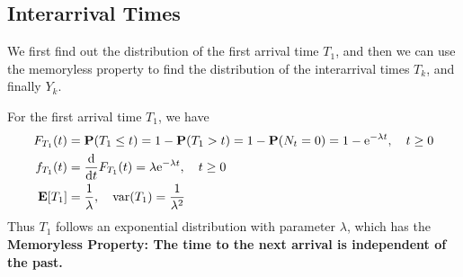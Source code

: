 \subsection{Interarrival Times}
We first find out the distribution of the first arrival time $T_1$, and then we can use the memoryless property to find the distribution of the interarrival times $T_k$, and finally $Y_k$.

For the first arrival time $T_1$, we have
\begin{align}
    F_{T_1}(t) &= \mathbf{P}(T_1 \leq t) = 1 - \mathbf{P}(T_1 > t) = 1 - \mathbf{P}(N_t = 0) = 1 - \mathrm{e}^{-\lambda t}, \quad t \geq 0 \\ 
    f_{T_1}(t) &= \dv{t} F_{T_1}(t) = \lambda \mathrm{e}^{-\lambda t}, \quad t \geq 0 \\ 
    \mathbf{E}[T_1] &= \frac{1}{\lambda}, \quad \mathrm{var}(T_1) = \frac{1}{\lambda^2}
\end{align}
Thus $T_1$ follows an exponential distribution with parameter $\lambda$, which has the \textbf{Memoryless Property: The time to the next arrival is independent of the past.}

